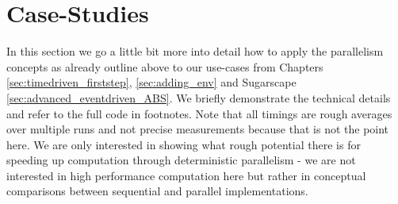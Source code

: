 \section{Case-Studies}
In this section we go a little bit more into detail how to apply the parallelism concepts as already outline above to our use-cases from Chapters \ref{sec:timedriven_firststep}, \ref{sec:adding_env} and Sugarscape \ref{sec:advanced_eventdriven_ABS}. We briefly demonstrate the technical details and refer to the full code in footnotes. Note that all timings are rough averages over multiple runs and not precise measurements because that is not the point here. We are only interested in showing what rough potential there is for speeding up computation through deterministic parallelism - we are not interested in high performance computation here but rather in conceptual comparisons between sequential and parallel implementations.




\\
